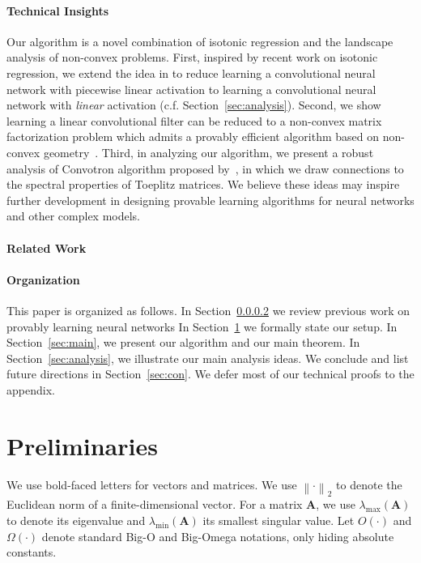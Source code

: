\documentclass[11pt]{article}
\newcommand{\mat}[1]{\mathbf{#1}}
\newcommand{\norm}[1]{\left\|#1\right\|}
\begin{document}
\paragraph{Technical Insights}
Our algorithm is a novel combination of isotonic regression and the landscape analysis of non-convex problems.
First, inspired by recent work on isotonic regression, we extend the idea in \cite{goel2018learning} to reduce learning a convolutional neural network with piecewise linear activation to learning a convolutional neural network with \emph{linear} activation (c.f. Section~\ref{sec:analysis}).
Second, we show learning a linear convolutional filter can be reduced to a non-convex matrix factorization problem which admits a provably efficient algorithm based on non-convex geometry~\citep{ge2017no}.
Third, in analyzing our algorithm, we present a robust analysis of Convotron algorithm proposed by~\citet{goel2018learning}, in which we draw connections to the spectral properties of Toeplitz matrices.
We believe these ideas may inspire further development in designing provable learning algorithms for neural networks and other complex models.

\paragraph{Related Work}\label{sec:rel}\paragraph{Organization}
This paper is organized as follows.
In Section~\ref{sec:rel} we review previous work on provably learning neural networks 
In Section~\ref{sec:pre} we formally state our setup.
In Section~\ref{sec:main}, we present our algorithm and our main theorem.
In Section~\ref{sec:analysis}, we illustrate our main analysis ideas.
We conclude and list future directions in Section~\ref{sec:con}.
We defer most of our technical proofs to the appendix.



\section{Preliminaries}
\label{sec:pre}
We use bold-faced letters for vectors and matrices.
We use $\norm{\cdot}_2$ to denote the Euclidean norm of a finite-dimensional vector.
For a matrix $\mat{A}$, we use $\lambda_{\max}\left(\mat{A}\right)$ to denote its eigenvalue and $\lambda_{\min}\left(\mat{A}\right)$ its smallest singular value.
Let $O(\cdot)$ and $\Omega\left(\cdot\right)$ denote standard Big-O and Big-Omega  notations, only hiding absolute constants.
\end{document}
